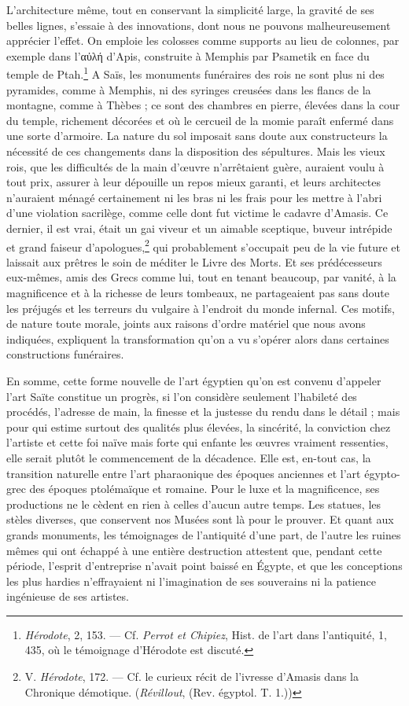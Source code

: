 \documentclass[letterpaper,twocolumn,openany,nodeprecatedcode]{dndbook}
\begin{document}
L'architecture même, tout en conservant la simplicité large, la gravité de ses belles lignes, s'essaie à des innovations, dont nous ne pouvons malheureusement apprécier l'effet. On emploie les colosses comme supports au lieu de colonnes, par exemple dans l'αὐλή d'Apis, construite à Memphis par Psametik en face du temple de Ptah.\footnote{\emph{Hérodote}, 2, 153. --- Cf. \emph{Perrot et Chipiez}, Hist. de l'art dans l'antiquité, 1, 435, où le témoignage d'Hérodote est discuté.} A Saïs, les monuments funéraires des rois ne sont plus ni des pyramides, comme à Memphis, ni des syringes creusées dans les flancs de la montagne, comme à Thèbes ; ce sont des chambres en pierre, élevées dans la cour du temple, richement décorées et où le cercueil de la momie paraît enfermé dans une sorte d'armoire. La nature du sol imposait sans doute aux constructeurs la nécessité de ces changements dans la disposition des sépultures. Mais les vieux rois, que les difficultés de la main d'œuvre n'arrêtaient guère, auraient voulu à tout prix, assurer à leur dépouille un repos mieux garanti, et leurs architectes n'auraient ménagé certainement ni les bras ni les frais pour les mettre à l'abri d'une violation sacrilège, comme celle dont fut victime le cadavre d'Amasis. Ce dernier, il est vrai, était un gai viveur et un aimable sceptique, buveur intrépide et grand faiseur d'apologues,\footnote{V. \emph{Hérodote}, 172. --- Cf. le curieux récit de l'ivresse d'Amasis dans la Chronique démotique. (\emph{Révillout}, (Rev. égyptol. T. 1.))} qui probablement s'occupait peu de la vie future et laissait aux prêtres le soin de méditer le Livre des Morts. Et ses prédécesseurs eux-mêmes, amis des Grecs comme lui, tout en tenant beaucoup, par vanité, à la magnificence et à la richesse de leurs tombeaux, ne partageaient pas sans doute les préjugés et les terreurs du vulgaire à l'endroit du monde infernal. Ces motifs, de nature toute morale, joints aux raisons d'ordre matériel que nous avons indiquées, expliquent la transformation qu'on a vu s'opérer alors dans certaines constructions funéraires.

En somme, cette forme nouvelle de l'art égyptien qu'on est convenu d'appeler l'art Saïte constitue un progrès, si l'on considère seulement l'habileté des procédés, l'adresse de main, la finesse et la justesse du rendu dans le détail ; mais pour qui estime surtout des qualités plus élevées, la sincérité, la conviction chez l'artiste et cette foi naïve mais forte qui enfante les œuvres vraiment ressenties, elle serait plutôt le commencement de la décadence. Elle est, en-tout cas, la transition naturelle entre l'art pharaonique des époques anciennes et l'art égypto-grec des époques ptolémaïque et romaine. Pour le luxe et la magnificence, ses productions ne le cèdent en rien à celles d'aucun autre temps. Les statues, les stèles diverses, que conservent nos Musées sont là pour le prouver. Et quant aux grands monuments, les témoignages de l'antiquité d'une part, de l'autre les ruines mêmes qui ont échappé à une entière destruction attestent que, pendant cette période, l'esprit d'entreprise n'avait point baissé en Égypte, et que les conceptions les plus hardies n'effrayaient ni l'imagination de ses souverains ni la patience ingénieuse de ses artistes.
\end{document}
